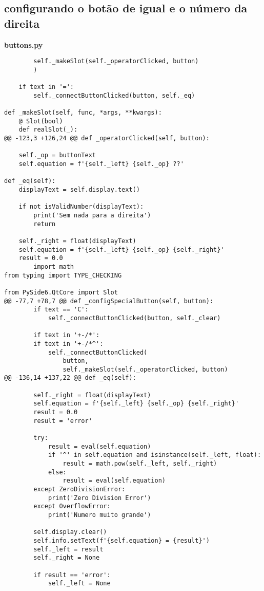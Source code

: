 \documentclass[12pt,a4paper]{article}
\begin{document}
\subsection{configurando o botão de igual e o número da direita}
    \textbf{buttons.py}
    \begin{lstlisting}
        self._makeSlot(self._operatorClicked, button)
        )

    if text in '=':
        self._connectButtonClicked(button, self._eq)

def _makeSlot(self, func, *args, **kwargs):
    @ Slot(bool)
    def realSlot(_):
@@ -123,3 +126,24 @@ def _operatorClicked(self, button):

    self._op = buttonText
    self.equation = f'{self._left} {self._op} ??'

def _eq(self):
    displayText = self.display.text()

    if not isValidNumber(displayText):
        print('Sem nada para a direita')
        return

    self._right = float(displayText)
    self.equation = f'{self._left} {self._op} {self._right}'
    result = 0.0 
        import math
from typing import TYPE_CHECKING

from PySide6.QtCore import Slot
@@ -77,7 +78,7 @@ def _configSpecialButton(self, button):
        if text == 'C':
            self._connectButtonClicked(button, self._clear)

        if text in '+-/*':
        if text in '+-/*^':
            self._connectButtonClicked(
                button,
                self._makeSlot(self._operatorClicked, button)
@@ -136,14 +137,22 @@ def _eq(self):

        self._right = float(displayText)
        self.equation = f'{self._left} {self._op} {self._right}'
        result = 0.0
        result = 'error'

        try:
            result = eval(self.equation)
            if '^' in self.equation and isinstance(self._left, float):
                result = math.pow(self._left, self._right)
            else:
                result = eval(self.equation)
        except ZeroDivisionError:
            print('Zero Division Error')
        except OverflowError:
            print('Numero muito grande')

        self.display.clear()
        self.info.setText(f'{self.equation} = {result}')
        self._left = result
        self._right = None

        if result == 'error':
            self._left = None
    \end{lstlisting}
\end{document}
